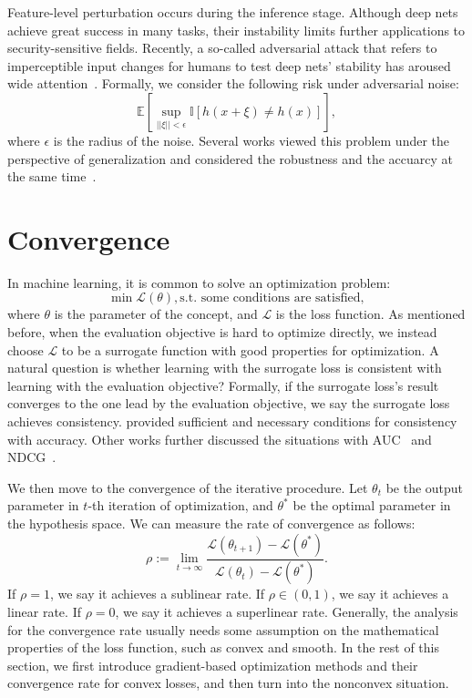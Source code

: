 \documentclass[a4paper,11pt]{article}
\begin{document}
Feature-level perturbation occurs during the inference stage. Although deep nets achieve great success in many tasks, their instability limits further applications to security-sensitive fields. Recently, a so-called adversarial attack that refers to imperceptible input changes for humans to test deep nets' stability has aroused wide attention~\citep{goodfellow2014explaining}. Formally, we consider the following risk under adversarial noise: $$\mathbb{E}[\sup_{||\xi|| < \epsilon} \mathbb{I}[h(x + \xi) \neq h(x)]],$$ where $\epsilon$ is the radius of the noise. Several works viewed this problem under the perspective of generalization and considered the robustness and the accuarcy at the same time~\citep{tsipras2018robustness,zhang2019theoretically,ilyas2019adversarial}.


\section{Convergence}
\label{sec:Convergence}
In machine learning, it is common to solve an optimization problem: $$\min \mathcal{L}(\theta), \text{s.t. some conditions are satisfied},$$ where $\theta$ is the parameter of the concept, and $\mathcal{L}$ is the loss function. As mentioned before, when the evaluation objective is hard to optimize directly, we instead choose $\mathcal{L}$ to be a surrogate function with good properties for optimization. A natural question is whether learning with the surrogate loss is consistent with learning with the evaluation objective? Formally, if the surrogate loss's result converges to the one lead by the evaluation objective, we say the surrogate loss achieves consistency. \citet{bartlett2006convexity} provided sufficient and necessary conditions for consistency with accuracy. Other works further discussed the situations with AUC~\citep{gao2015consistency} and NDCG~\citep{ravikumar2011ndcg}.

We then move to the convergence of the iterative procedure. Let $\theta_t$ be the output parameter in $t$-th iteration of optimization, and $\theta^*$ be the optimal parameter in the hypothesis space. We can measure the rate of convergence as follows: $$\rho := \lim_{t\rightarrow\infty} \frac{\mathcal{L}(\theta_{t+1}) - \mathcal{L}(\theta^*)}{\mathcal{L}(\theta_{t}) - \mathcal{L}(\theta^*)}.$$ If $\rho=1$, we say it achieves a sublinear rate. If $\rho \in (0, 1)$, we say it achieves a linear rate. If $\rho = 0$, we say it achieves a superlinear rate. Generally, the analysis for the convergence rate usually needs some assumption on the mathematical properties of the loss function, such as convex and smooth. In the rest of this section, we first introduce gradient-based optimization methods and their convergence rate for convex losses, and then turn into the nonconvex situation.
\end{document}
